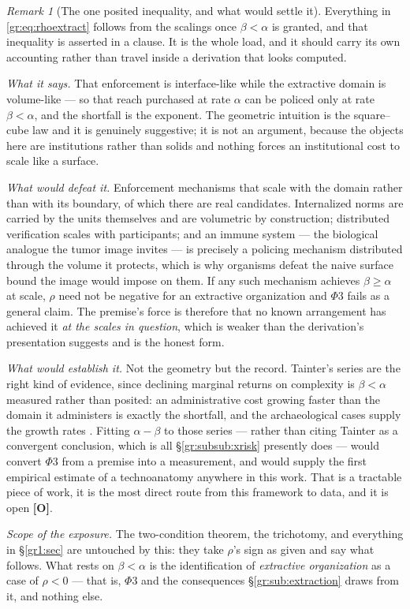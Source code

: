 \documentclass[11pt]{article}
\numberwithin{equation}{section}
\theoremstyle{plain}
\theoremstyle{definition}
\theoremstyle{remark}
\newtheorem{remark}[theorem]{Remark}
\begin{document}
\begin{remark}[The one posited inequality, and what would settle it]
\label{gr:rem:betaalpha}
Everything in \eqref{gr:eq:rhoextract} follows from the scalings once
$\beta<\alpha$ is granted, and that inequality is asserted in a clause.
It is the whole load, and it should carry its own accounting rather
than travel inside a derivation that looks computed.

\emph{What it says.} That enforcement is interface-like while the
extractive domain is volume-like --- so that reach purchased at rate
$\alpha$ can be policed only at rate $\beta<\alpha$, and the shortfall
is the exponent. The geometric intuition is the square--cube law and it
is genuinely suggestive; it is not an argument, because the objects
here are institutions rather than solids and nothing forces an
institutional cost to scale like a surface.

\emph{What would defeat it.} Enforcement mechanisms that scale with the
domain rather than with its boundary, of which there are real
candidates. Internalized norms are carried by the units themselves and
are volumetric by construction; distributed verification scales with
participants; and an immune system --- the biological analogue the
tumor image invites --- is precisely a policing mechanism distributed
through the volume it protects, which is why organisms defeat the naive
surface bound the image would impose on them. If any such mechanism
achieves $\beta\ge\alpha$ at scale, $\rho$ need not be negative for an
extractive organization and $\Phi3$ fails as a general claim. The
premise's force is therefore that no known arrangement has achieved it
\emph{at the scales in question}, which is weaker than the derivation's
presentation suggests and is the honest form.

\emph{What would establish it.} Not the geometry but the record.
Tainter's series are the right kind of evidence, since declining
marginal returns on complexity is $\beta<\alpha$ measured rather than
posited: an administrative cost growing faster than the domain it
administers is exactly the shortfall, and the archaeological cases
supply the growth rates \cite{Tainter88}. Fitting $\alpha-\beta$ to
those series --- rather than citing Tainter as a convergent conclusion,
which is all \S\ref{gr:subsub:xrisk} presently does --- would convert
$\Phi3$ from a premise into a measurement, and would supply the first
empirical estimate of a technoanatomy anywhere in this work. That is a
tractable piece of work, it is the most direct route from this
framework to data, and it is open \textbf{[O]}.

\emph{Scope of the exposure.} The two-condition theorem, the
trichotomy, and everything in \S\ref{gr1:sec} are untouched by this:
they take $\rho$'s sign as given and say what follows. What rests on
$\beta<\alpha$ is the identification of \emph{extractive organization}
as a case of $\rho<0$ --- that is, $\Phi3$ and the consequences
\S\ref{gr:sub:extraction} draws from it, and nothing else.
\end{remark}
\end{document}
